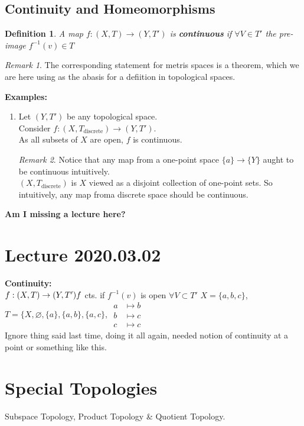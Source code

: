 \documentclass{article}
\renewcommand{\emptyset}{\varnothing}
\newtheorem{sdefinition}[stheorem]{Definition}
\theoremstyle{remark}
\theoremstyle{example}
\theoremstyle{examples}
\newtheorem*{remark}{Remark}
\begin{document}
	\subsection{Continuity and Homeomorphisms}
	\setcounter{theorem}{3}
	\setcounter{stheorem}{0}
	\begin{sdefinition}
		A map $f:(X,T) \to (Y, T')$ is \textbf{continuous} if $\forall V \in T'$ the pre-image $f^{-1}(v) \in T$
	\end{sdefinition}
	\begin{remark}
		The corresponding statement for metris spaces is a theorem, which we are here using as the abasis for a defiition in topological spaces.
	\end{remark}
	\textbf{Examples:}
	\begin{enumerate}
		\item Let $(Y,T')$ be any topological space.\\
		Consider $f:(X,T_\mathrm{discrete}) \to (Y,T')$.\\
		As all subsets of $X$ are open, $f$ is continuous.
		\begin{remark}
			Notice that any map from a one-point space $\{a\} \to \{Y\}$ aught to be continuous intuitively.\\
			$(X,T_\mathrm{discrete})$ is $X$ viewed as a disjoint collection of one-point sets. So intuitively, any map froma discrete space should be continuous.
		\end{remark}
	\end{enumerate}

	\textbf{Am I missing a lecture here?}
	
	\section*{Lecture 2020.03.02}
	\textbf{Continuity:}\\
	$f:(X,T) \to (Y,T')\\
	f$ cts. if $f^{-1}(v)$ is open $\forall V \subset T'$
	$X=\{a,b,c\}$, $T=\{X,\emptyset, \{a\}, \{a,b\}, \{a,c\}$, 
	$\begin{aligned}
		a & \mapsto b\\
		b & \mapsto c\\
		c & \mapsto c
	\end{aligned}$\\
	Ignore thing said last time, doing it all again, needed notion of continuity at a point or something like this.
	\pagebreak
	
	\section{Special Topologies}
	Subspace Topology, Product Topology \& Quotient Topology.
	
\end{document}
